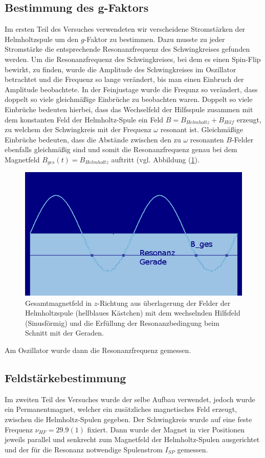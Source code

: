 \documentclass[a4paper,10pt]{scrartcl} %
\begin{document}
\subsection{Bestimmung des g-Faktors}
\label{subsec:g-Faktor}
Im ersten Teil des Versuches verwendeten wir verscheidene Stromstärken der Helmholtzspule um den $g$-Faktor zu bestimmen. Dazu musste zu jeder Stromstärke die entsprechende Resonanzfrequenz des Schwingkreises gefunden werden. Um die Resonanzfrequenz des Schwingkreises, bei dem es einen Spin-Flip bewirkt, zu finden, wurde die Amplitude des Schwingkreises im Oszillator betrachtet und die Frequenz so lange verändert, bis man einen Einbruch der Amplitude beobachtete. In der Feinjustage wurde die Frequnz so verändert, dass doppelt so viele gleichmä\ss ige Einbrüche zu beobachten waren. Doppelt so viele Einbrüche bedeuten hierbei, dass das Wechselfeld der Hilfsspule zusammen mit dem konstanten Feld der Helmholtz-Spule ein Feld $B = B_{Helmholtz} + B_{Hilf}$ erzeugt, zu welchem der Schwingkreis mit der Frequenz $\omega$ resonant ist. Gleichmä\ss ige Einbrüche bedeuten, dass die Abstände zwischen den zu $\omega$ resonanten $B$-Felder ebenfalls gleichmä\ss ig sind und somit die Resonanzfrequenz genau bei dem Magnetfeld $B_{ges}(t) = B_{Helmholtz}$ auftritt (vgl. Abbildung (\ref{fig:Resonanz}).
\begin{figure}
\label{fig:Resonanz}
\includegraphics[width=\textwidth]{Bilder/sinus.png}
\caption{Gesamtmagnetfeld in $z$-Richtung aus überlagerung der Felder der Helmholtzspule (hellblaues Kästchen) mit dem wechselnden Hilfsfeld (Sinusförmig) und die Erfüllung der Resonanzbedingung beim Schnitt mit der Geraden.}
\end{figure}
Am Oszillator wurde dann die Resonanzfrequenz gemessen.
\subsection{Feldstärkebestimmung}
\label{subsec:Feldstaerkebestimmung}
Im zweiten Teil des Versuches wurde der selbe Aufbau verwendet, jedoch wurde ein Permanentmagnet, welcher ein zusätzliches magnetisches Feld erzeugt, zwischen die Helmholtz-Spulen gegeben. Der Schwingkreis wurde auf eine feste Frequenz $\nu _{HF} = 29.9(1)$ fixiert. Dann wurde der Magnet in vier Positionen jeweils parallel und senkrecht zum Magnetfeld der Helmholtz-Spulen ausgerichtet und der für die Resonanz notwendige Spulenstrom $I_{SP}$ gemessen.
\end{document}
